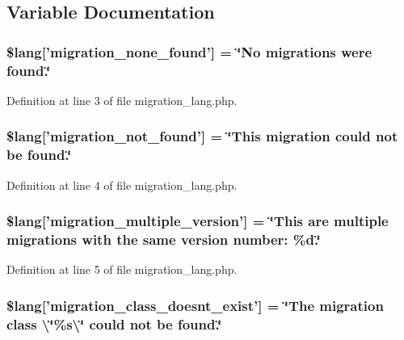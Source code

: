 \subsection{Variable Documentation}
\hypertarget{migration__lang_8php_affa6337f0973de810b3c61491deae6b1}{
\subsubsection[{\$lang}]{\setlength{\rightskip}{0pt plus 5cm}\$lang\mbox{[}'migration\-\_\-none\-\_\-found'\mbox{]} = \char`\"{}No migrations were found.\char`\"{}}}\label{migration__lang_8php_affa6337f0973de810b3c61491deae6b1}


Definition at line 3 of file migration\-\_\-lang.\-php.

\hypertarget{migration__lang_8php_a92dd777422d70950993d43f4d0c31b1b}{
\subsubsection[{\$lang}]{\setlength{\rightskip}{0pt plus 5cm}\$lang\mbox{[}'migration\-\_\-not\-\_\-found'\mbox{]} = \char`\"{}This migration could {\bf not} be found.\char`\"{}}}\label{migration__lang_8php_a92dd777422d70950993d43f4d0c31b1b}


Definition at line 4 of file migration\-\_\-lang.\-php.

\hypertarget{migration__lang_8php_a1a98130d04f280e6a5f6f509179f9e01}{
\subsubsection[{\$lang}]{\setlength{\rightskip}{0pt plus 5cm}\$lang\mbox{[}'migration\-\_\-multiple\-\_\-version'\mbox{]} = \char`\"{}This are multiple migrations with the same version number\-: \%d.\char`\"{}}}\label{migration__lang_8php_a1a98130d04f280e6a5f6f509179f9e01}


Definition at line 5 of file migration\-\_\-lang.\-php.

\hypertarget{migration__lang_8php_a141dceda5b8294f6e4ddf7e5da6fe71d}{
\subsubsection[{\$lang}]{\setlength{\rightskip}{0pt plus 5cm}\$lang\mbox{[}'migration\-\_\-class\-\_\-doesnt\-\_\-exist'\mbox{]} = \char`\"{}The migration class \textbackslash{}\char`\"{}\%s\textbackslash{}\char`\"{} could {\bf not} be found.\char`\"{}}}\label{migration__lang_8php_a141dceda5b8294f6e4ddf7e5da6fe71d}


